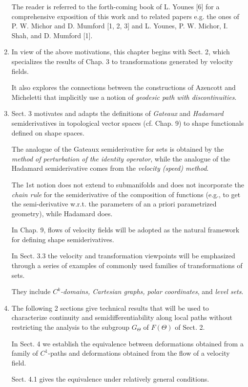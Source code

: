 \documentclass{book}
\numberwithin{equation}{section}
\begin{document}
\begin{enumerate}
    The reader is referred to the forth-coming book of L. Younes [6] for a comprehensive exposition of this work and to related papers e.g. the ones of P. W. Michor and D. Mumford [1, 2, 3] and L. Younes, P. W. Michor, I. Shah, and D. Mumford [1].
    \item In view of the above motivations, this chapter begins with Sect. 2, which specializes the results of Chap. 3 to transformations generated by velocity fields.
    
    It also explores the connections between the constructions of Azencott and Micheletti that implicitly use a notion of \textit{geodesic path with discontinuities}.
    \item Sect. 3 motivates and adapts the definitions of \textit{Gateaux} and \textit{Hadamard} semiderivatives in topological vector spaces (cf. Chap. 9) to shape functionals defined on shape spaces.
    
    The analogue of the Gateaux semiderivative for sets is obtained by the \textit{method of perturbation of the identity operator}, while the analogue of the Hadamard semiderivative comes from the \textit{velocity (speed) method}.
    
    The 1st notion does not extend to submanifolds and does not incorporate the \textit{chain rule} for the semiderivative of the composition of functions (e.g., to get the semi-derivative w.r.t. the parameters of an a priori parametrized geometry), while Hadamard does.
    
    In Chap. 9, flows of velocity fields will be adopted as the natural framework for defining shape semiderivatives.
    
    In Sect. 3.3 the velocity and transformation viewpoints will be emphasized through a series of examples of commonly used families of transformations of sets.
    
    They include \textit{$C^k$-domains, Cartesian graphs, polar coordinates}, and \textit{level sets}.
    \item The following 2 sections give technical results that will be used to characterize continuity and semidifferentiability along local paths without restricting the analysis to the subgroup $G_\Theta$ of $F(\Theta)$ of Sect. 2.
    
    In Sect. 4 we establish the equivalence between deformations obtained from a family of $C^1$-paths and deformations obtained from the flow of a velocity field.
    
    Sect. 4.1 gives the equivalence under relatively general conditions.
    

\end{enumerate}
\end{document}

